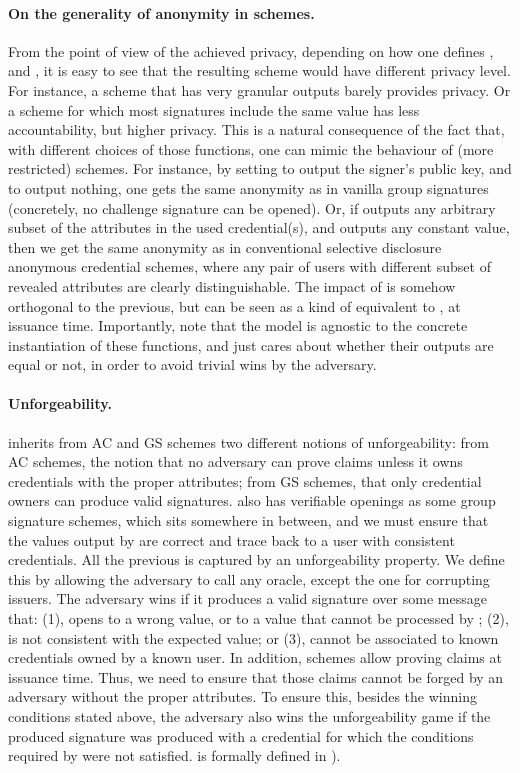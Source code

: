 \paragraph{On the generality of anonymity in \UAS schemes.} %
From the point of view of the achieved privacy, depending on how one defines
\fissue, \feval and \finsp, it is easy to see that the resulting scheme would
have different privacy level. For instance, a scheme that has very granular
\feval outputs barely provides privacy. Or a scheme for which most signatures
include the same \finsp value has less accountability, but higher privacy.
%
This is a natural consequence of the fact that, with different choices of those
functions, one can mimic the behaviour of (more restricted) schemes. For
instance, by setting \finsp to output the signer's public key, and \feval to
output nothing, one gets the same anonymity as in vanilla group signatures
(concretely, no challenge signature can be opened). Or, if \feval outputs any
arbitrary subset of the attributes in the used credential(s), and \finsp outputs
any constant value, then we get the same anonymity as in conventional selective
disclosure anonymous credential schemes, where any pair of users with different
subset of revealed attributes are clearly distinguishable. The impact of \fissue
is somehow orthogonal to the previous, but can be seen as a kind of equivalent
to \feval, at issuance time.
%
Importantly, note that the model is agnostic to the concrete instantiation of
these functions, and just cares about whether their outputs are equal or not,
in order to avoid trivial wins by the adversary.

\paragraph{Unforgeability.} \UAS inherits from AC and GS schemes two different
notions of unforgeability: from AC schemes, the notion that no adversary can
prove claims unless it owns credentials with the proper attributes; from GS
schemes, that only credential owners can produce valid signatures. \UAS also
has verifiable openings as some group signature schemes, which sits somewhere
in between, and we must ensure that the values output by \Open are correct and
trace back to a user with consistent credentials. All the previous is captured
by an unforgeability property. We define this by allowing the adversary
to call any oracle, except the one for corrupting issuers. The adversary wins if
it produces a valid signature over some message that: (1), opens to a wrong
value, or to a value that cannot be processed by \Judge; (2), is not consistent
with the expected \Yeval value; or (3), cannot be associated to known
credentials owned by a known user.
%
In addition, \UAS schemes allow proving claims at issuance time. Thus, we
need to ensure that those claims cannot be forged by an adversary without the
proper attributes. To ensure this, besides the winning conditions stated above,
the adversary also wins the unforgeability game if the produced signature
was produced with a credential for which the conditions required by \fissue were
not satisfied.
%
\ExpForge is formally defined in ).


